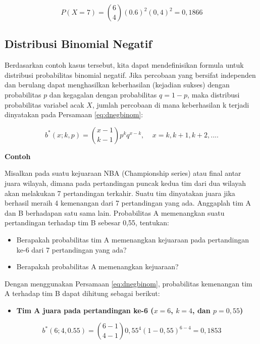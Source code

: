 \documentclass[]{book}
\providecommand{\tightlist}{%
  \setlength{\itemsep}{0pt}\setlength{\parskip}{0pt}}
\begin{document}
\[
P\left(X=7\right)=\binom{6}{4}\left(0.6\right)^2\left(0,4\right)^2=0,1866
\]

\subsection{Distribusi Binomial
Negatif}\label{distribusi-binomial-negatif}

Berdasarkan contoh kasus tersebut, kita dapat mendefinisikan formula
untuk distribusi probabilitas binomial negatif. Jika percobaan yang
bersifat independen dan berulang dapat menghasilkan keberhasilan
(kejadian sukses) dengan probabilitas \(p\) dan kegagalan dengan
probabilitas \(q=1-p\), maka distribusi probabilitas variabel acak
\(X\), jumlah percobaan di mana keberhasilan k terjadi dinyatakan pada
Persamaan \eqref{eq:dnegbinom}:

\begin{equation}
   b^{\ast}\left(x;k,p\right)=\binom{x-1}{k-1}p^kq^{x-k},\ \ \ \ \ x=k,k+1,k+2,....
  \label{eq:dnegbinom}
\end{equation}

\textbf{Contoh}

Misalkan pada suatu kejuaraan NBA (Championship series) atau final antar
juara wilayah, dimana pada pertandingan puncak kedua tim dari dua
wilayah akan melakukan 7 pertandingan terkahir. Suatu tim dinyatakan
juara jika berhasil meraih 4 kemenangan dari 7 pertandingan yang ada.
Anggaplah tim A dan B berhadapan satu sama lain. Probabilitas A
memenangkan suatu pertandingan terhadap tim B sebesar 0,55, tentukan:

\begin{itemize}
\tightlist
\item
  Berapakah probabilitas tim A memenangkan kejuaraan pada pertandingan
  ke-6 dari 7 pertandingan yang ada?
\item
  Berapakah probabilitas A memenangkan kejuaraan?
\end{itemize}

Dengan menggunakan Persamaan \eqref{eq:dnegbinom}, probabilitas kemenangan
tim A terhadap tim B dapat dihitung sebagai berikut:

\begin{itemize}
\tightlist
\item
  \textbf{Tim A juara pada pertandingan ke-6 (\(x=6\), \(k=4\), dan
  \(p=0,55\))}
\end{itemize}

\[
b^{\ast}\left(6;4,0.55\right)=\binom{6-1}{4-1}0,55^4\left(1-0,55\right)^{6-4}=0,1853
\]
\end{document}
